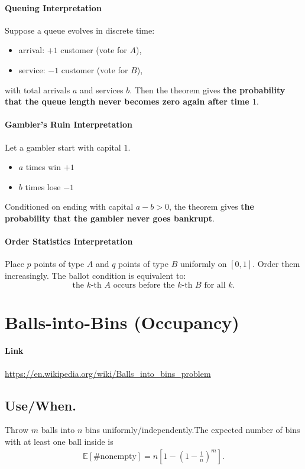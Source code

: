 \documentclass[11pt,A4,twoside]{article}
\let\oldsection\section
\renewcommand{\section}{\FloatBarrier\oldsection}
\let\oldsubsection\subsection
\renewcommand{\subsection}{\FloatBarrier\oldsubsection}
\numberwithin{equation}{section}
\newcommand{\E}{\mathbb{E}}
\theoremstyle{definition}
\theoremstyle{remark}
\newcommand\bal{\begin{aligned}}
\newcommand\eal{\end{aligned}}
\newcommand{\beql}[1]{\begin{equation}\label{#1}\bal}
\newcommand{\eeql}{\eal\end{equation}}
\begin{document}
\paragraph{Queuing Interpretation}
Suppose a queue evolves in discrete time:
\begin{itemize}
\item arrival: $+1$ customer (vote for $A$),
\item service: $-1$ customer (vote for $B$),
\end{itemize}
with total arrivals $a$ and services $b$.
Then the theorem gives \textbf{the probability that the queue length never becomes zero again after time $1$}.

\paragraph{Gambler's Ruin Interpretation}
Let a gambler start with capital $1$.  
\begin{itemize}
    \item $a$ times win $+1$
    \item $b$ times lose $-1$
\end{itemize}

Conditioned on ending with capital $a-b > 0$, the theorem gives \textbf{the probability that the gambler never goes bankrupt}.

\paragraph{Order Statistics Interpretation}
Place $p$ points of type $A$ and $q$ points of type $B$ uniformly on $[0,1]$.  
Order them increasingly.  
The ballot condition is equivalent to:
\[
\text{the $k$-th $A$ occurs before the $k$-th $B$ for all } k.
\]

\section{Balls-into-Bins (Occupancy)}
\paragraph{Link} \url{https://en.wikipedia.org/wiki/Balls_into_bins_problem}

\subsection{Use/When.} 
Throw \(m\) balls  into \(n\) bins uniformly/independently.The expected number of bins with at least one ball inside is
\beql{}
\E[\#\text{nonempty}]=n\left[1-\left(1-\frac1 n\right)^m\right].
\eeql
\end{document}

